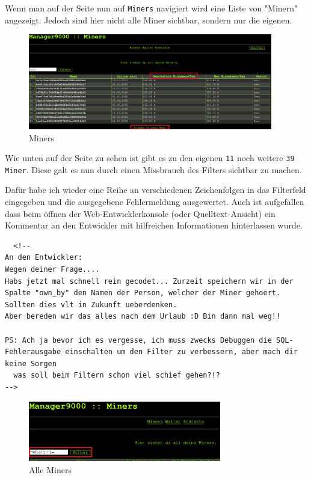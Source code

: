 \documentclass[12pt,a4paper,titlepage,oneside]{scrartcl}
\begin{document}
Wenn man auf der Seite nun auf \lstinline{Miners} navigiert wird eine Liste von "Minern" angezeigt.
Jedoch sind hier nicht alle Miner sichtbar, sondern nur die eigenen.

\begin{figure}[h!]
  \centering
  \includegraphics[width=0.95\textwidth]{./imgs/manager9000/miners_red.png}
\caption{Miners}
\label{fig:miners}
\end{figure}

Wie unten auf der Seite zu sehen ist gibt es zu den eigenen \lstinline{11} noch weitere \lstinline{39 Miner}.
Diese galt es nun durch einen Missbrauch des Filters sichtbar zu machen.

Dafür habe ich wieder eine Reihe an verschiedenen Zeichenfolgen in das Filterfeld eingegeben und die ausgegebene Fehlermeldung ausgewertet.
Auch ist aufgefallen dass beim öffnen der Web-Entwicklerkonsole (oder Quelltext-Ansicht) ein Kommentar an den Entwickler mit hilfreichen Informationen hinterlassen wurde.

\begin{lstlisting}
  <!--
An den Entwickler:
Wegen deiner Frage....
Habs jetzt mal schnell rein gecodet... Zurzeit speichern wir in der Spalte "own_by" den Namen der Person, welcher der Miner gehoert. Sollten dies vlt in Zukunft ueberdenken.
Aber bereden wir das alles nach dem Urlaub :D Bin dann mal weg!!

PS: Ach ja bevor ich es vergesse, ich muss zwecks Debuggen die SQL-Fehlerausgabe einschalten um den Filter zu verbessern, aber mach dir keine Sorgen
  was soll beim Filtern schon viel schief gehen?!?
-->
\end{lstlisting}

\begin{figure}[h!]
  \centering
  \includegraphics[width=0.75\textwidth]{./imgs/manager9000/all_miners_red.png}
\caption{Alle Miners}
\label{fig:all_miners}
\end{figure}
\end{document}
